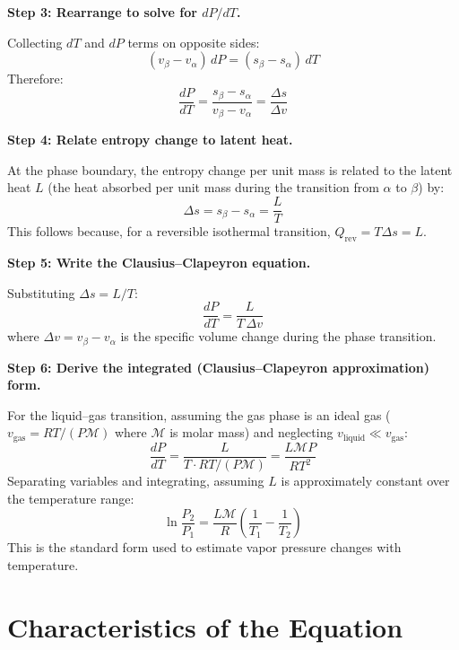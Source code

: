 \documentclass[11pt,openright]{book}
\begin{document}
\textbf{Step 3: Rearrange to solve for $dP/dT$.}

Collecting $dT$ and $dP$ terms on opposite sides:
\begin{equation}
(v_\beta - v_\alpha)\,dP = (s_\beta - s_\alpha)\,dT
\end{equation}
Therefore:
\begin{equation}
\frac{dP}{dT} = \frac{s_\beta - s_\alpha}{v_\beta - v_\alpha} = \frac{\Delta s}{\Delta v}
\end{equation}

\textbf{Step 4: Relate entropy change to latent heat.}

At the phase boundary, the entropy change per unit mass is related to the latent heat $L$ (the heat absorbed per unit mass during the transition from $\alpha$ to $\beta$) by:
\begin{equation}
\Delta s = s_\beta - s_\alpha = \frac{L}{T}
\end{equation}
This follows because, for a reversible isothermal transition, $Q_{\text{rev}} = T\Delta s = L$.

\textbf{Step 5: Write the Clausius--Clapeyron equation.}

Substituting $\Delta s = L/T$:
\begin{equation}
\boxed{\frac{dP}{dT} = \frac{L}{T\,\Delta v}}
\end{equation}
where $\Delta v = v_\beta - v_\alpha$ is the specific volume change during the phase transition.

\textbf{Step 6: Derive the integrated (Clausius--Clapeyron approximation) form.}

For the liquid--gas transition, assuming the gas phase is an ideal gas ($v_{\text{gas}} = RT/(P\mathcal{M})$ where $\mathcal{M}$ is molar mass) and neglecting $v_{\text{liquid}} \ll v_{\text{gas}}$:
\begin{equation}
\frac{dP}{dT} = \frac{L}{T \cdot RT/(P\mathcal{M})} = \frac{L\mathcal{M}P}{RT^2}
\end{equation}
Separating variables and integrating, assuming $L$ is approximately constant over the temperature range:
\begin{equation}
\ln\frac{P_2}{P_1} = \frac{L\mathcal{M}}{R}\left(\frac{1}{T_1} - \frac{1}{T_2}\right)
\end{equation}
This is the standard form used to estimate vapor pressure changes with temperature.

\section*{Characteristics of the Equation}
\end{document}
